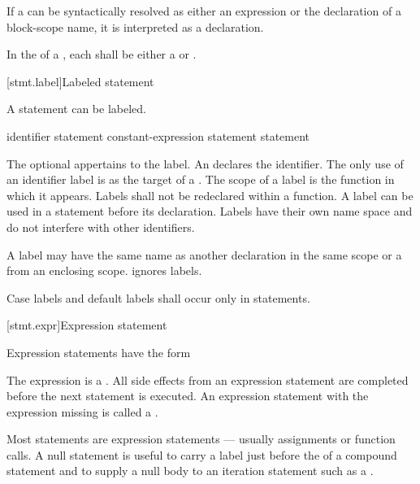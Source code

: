\pnum
If a  can be syntactically resolved as either an
expression or the declaration of a block-scope name, it is interpreted as a
declaration.

\pnum
In the  of a , each
 shall be either a 
or .

[stmt.label]{Labeled statement}%

\pnum
{}%
%
A statement can be labeled.

\begin{bnf}
\br
     identifier \terminal{:} statement\br
      constant-expression \terminal{:} statement\br
      \terminal{:} statement
\end{bnf}

The optional  appertains to the label. An
 declares the identifier. The only use of an
identifier label is as the target of a
%
.
%
The scope of a label is the function in which it appears. Labels shall
not be redeclared within a function. A label can be used in a
 statement before its declaration.
%
Labels have their own name space and do not interfere with other
identifiers.
\begin{note}
A label may have the same name as another declaration in the same scope or a
 from an enclosing scope.  ignores labels.
\end{note}

\pnum
{}%
%
Case labels and default labels shall occur only in  statements.


[stmt.expr]{Expression statement}%

\pnum
Expression statements have the form
\begin{bnf}
\br
     \terminal{;}
\end{bnf}

The expression is
a .
All
%
side effects from an expression statement
are completed before the next statement is executed.
%
%
An expression statement with the expression missing is called
a .
\begin{note}
Most statements are expression statements --- usually assignments or
function calls. A null statement is useful to carry a label just before
the \tcode{\}} of a compound statement and to supply a null body to an
iteration statement such as a .
\end{note}

